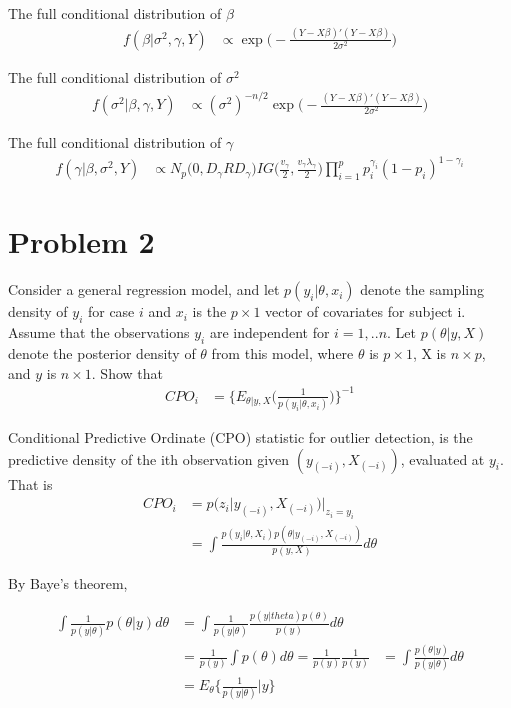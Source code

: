 The full conditional distribution of $\beta$
\begin{align*}
 f(\beta |\sigma^2, \gamma, Y) &\propto  \exp \big(-\frac{(Y- X \beta)'(Y- X \beta)}{2 \sigma^2} \big) 
 \end{align*}

The full conditional distribution of $\sigma^2$ 
\begin{align*}
 f(\sigma^2 |\beta, \gamma, Y) &\propto (\sigma^2)^{-n/2} \exp \big(-\frac{(Y- X \beta)'(Y- X \beta)}{2 \sigma^2} \big)  
 \end{align*}

The full conditional distribution of $\gamma$ 
\begin{align*}
 f(\gamma |\beta, \sigma^2, Y) &\propto   N_p \big( 0, D_{\gamma} R D_{\gamma} \big) IG \Big( \frac{v_{\gamma}}{2}, \frac{v_{\gamma} \lambda_{\gamma}}{2} \Big) \prod_{i=1}^p p_i^{\gamma_i} (1- p_i)^{1- \gamma_i}
 \end{align*}

\section{Problem 2}
Consider a general regression model, and let $p(y_i | \theta, x_i)$ denote the sampling density of $y_i$ for case $i$ and $x_i$ is the $p \times 1$ vector of covariates for subject i. Assume that the observations $y_i$ are independent for $i=1,..n$. Let $p(\theta| y, X)$ denote the posterior density of $\theta$ from this model, where $\theta$ is $p \times 1$, X is $n \times p$, and $y$ is $n \times 1$. Show that 
\begin{align*}
 CPO_i &= \Big \{ E_{\theta|y, X} \big( \frac{1}{p(y_i | \theta, x_i)} \big) \Big \}^{-1}
 \end{align*}

Conditional Predictive Ordinate (CPO) statistic for outlier detection, is the predictive density of the ith observation given $(y_{(-i)}, X_{(-i)})$, evaluated at $y_i$. That is
  \begin{align*}
  CPO_i & = p \big(z_i | y_{(-i)}, X_{(-i)} \big) \big |_{z_i = y_i} \\
&=  \int  \frac{p(y_i | \theta, X_i) p(\theta | y_{(-i)}, X_{(-i)})}{p(y, X)} d\theta 
 \end{align*}

By Baye's theorem,

  \begin{align*}
\int \frac{1}{p(y| \theta)} p(\theta| y)  d\theta &= \int \frac{1}{p(y| \theta)} \frac{p(y|theta) p(\theta)}{p(y)} d\theta \\
&= \frac{1}{p(y)} \int p(\theta) d\theta = \frac{1}{p(y)}
 \frac{1}{p(y)} & = \int \frac{p(\theta| y)}{p(y| \theta)} d\theta\\
&= E_{\theta} \big \{ \frac{1}{p(y | \theta)} | y \big \}
 \end{align*}
 
